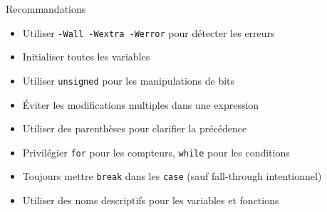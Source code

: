 \documentclass[10pt,a4paper]{article}
\begin{document}
\begin{techbox}{Recommandations}
\begin{itemize}
\item Utiliser \texttt{-Wall -Wextra -Werror} pour détecter les erreurs
\item Initialiser toutes les variables
\item Utiliser \texttt{unsigned} pour les manipulations de bits
\item Éviter les modifications multiples dans une expression
\item Utiliser des parenthèses pour clarifier la précédence
\item Privilégier \texttt{for} pour les compteurs, \texttt{while} pour les conditions
\item Toujours mettre \texttt{break} dans les \texttt{case} (sauf fall-through intentionnel)
\item Utiliser des noms descriptifs pour les variables et fonctions
\end{itemize}
\end{techbox}
\end{document}

